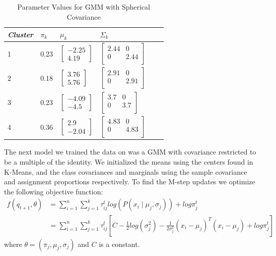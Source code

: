 \documentclass[paper=a4, fontsize=11pt]{scrartcl} %
\numberwithin{equation}{section} %
\numberwithin{figure}{section} %
\numberwithin{table}{section} %
\begin{document}
	\begin{table}
		\caption {Parameter Values for GMM with Spherical Covariance} \label{tab:title} 
		\begin{center}		
			\begin{tabular}{*6l}   
				\toprule
				\emph{Cluster}&  $\pi_k$ & $\mu_k$ & $\Sigma_k$\\\midrule
				1 & 0.23 
				& $\begin{bmatrix}-2.25 \\ 4.19\end{bmatrix}$  
				& $\begin{bmatrix}
				2.44 & 0 \\
				0 & 2.44 \\ \end{bmatrix}$\\
				2 & 0.18 
				& $\begin{bmatrix} 3.76 \\ 5.76\end{bmatrix}$ 
				& $\begin{bmatrix}
				2.91 & 0 \\
				0 & 2.91 \\ \end{bmatrix}$\\
				3 & 0.23
				& $\begin{bmatrix}-4.09 \\ -4.5\end{bmatrix}$ 
				& $\begin{bmatrix}
				3.7 & 0 \\
				0 &  3.7 \\ \end{bmatrix}$\\	
				4 & 0.36
				& $\begin{bmatrix}2.9 \\-2.04 \end{bmatrix}$ 
				& $\begin{bmatrix}
				4.83 & 0 \\
				0 &  4.83 \\ \end{bmatrix}$	
				\\\bottomrule
				\hline
			\end{tabular}
		\end{center}
	\end{table}

The next model we trained the data on was a GMM with covariance restricted to be a multiple of the identity. We initialized the means using the centers found in K-Means, and the class covariances and marginals using the sample covariance and assignment proportions respectively. To find the M-step updates we optimize the following objective function:
\begin{align*}
f(q_{t+1},\theta) &= \sum_{i=1}^{n}\sum_{j=1}^{k}\tau_{ij}^{t}log(P(x_i \mid \mu_j, \sigma_j)) + log\pi_j^t\\
&=  \sum_{i=1}^{n}\sum_{j=1}^{k}\tau_{ij}^{t}\left[ C-\frac{1}{2}log(\sigma_j^2)-\frac{1}{2\sigma_j^2}(x_i-\mu_j)^T(x_i-\mu_j) + log\pi_j^t\right]
\end{align*}
where \(\theta=(\pi_j, \mu_j, \sigma_j)\) and \(C\) is a constant.
\end{document}
